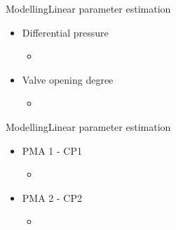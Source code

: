\begin{frame}{Modelling}{Linear parameter estimation}
\begin{itemize}
	\item<1-> Differential pressure 
	\begin{itemize}
		\item<1->[] 
			\begin{figure}[H]
			\centering
			 
			\end{figure}	
	\end{itemize}	
\end{itemize}

\begin{itemize}
	\item<1-> Valve opening degree
	\begin{itemize}
		\item<1->[] 
			\begin{figure}[H]
			\centering
			 
			\end{figure}	
	\end{itemize}	
\end{itemize}
\end{frame}

\begin{frame}{Modelling}{Linear parameter estimation}
\begin{itemize}
	\item<1-> PMA 1 - CP1
	\begin{itemize}
		\item<1->[] 
			\begin{figure}[H]
			\centering
			 
			\end{figure}	
	\end{itemize}	
\end{itemize}

\begin{itemize}
	\item<2-> PMA 2 - CP2
	\begin{itemize}
		\item<2->[] 
			\begin{figure}[H]
			\centering
			 
			\end{figure}	
	\end{itemize}	
\end{itemize}
\end{frame}

